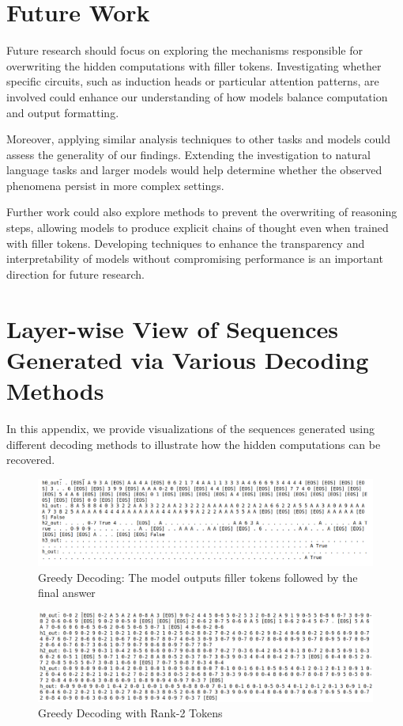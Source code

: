 \documentclass{article}
\begin{document}
\section{Future Work}

Future research should focus on exploring the mechanisms responsible for overwriting the hidden computations with filler tokens. Investigating whether specific circuits, such as induction heads or particular attention patterns, are involved could enhance our understanding of how models balance computation and output formatting.

Moreover, applying similar analysis techniques to other tasks and models could assess the generality of our findings. Extending the investigation to natural language tasks and larger models would help determine whether the observed phenomena persist in more complex settings.

Further work could also explore methods to prevent the overwriting of reasoning steps, allowing models to produce explicit chains of thought even when trained with filler tokens. Developing techniques to enhance the transparency and interpretability of models without compromising performance is an important direction for future research.

\newpage
\appendix

\section{Layer-wise View of Sequences Generated via Various Decoding Methods}

In this appendix, we provide visualizations of the sequences generated using different decoding methods to illustrate how the hidden computations can be recovered.

\begin{figure}[H]
    \centering
    \includegraphics[width=\textwidth]{greedy_decoding.png}
    \caption{Greedy Decoding: The model outputs filler tokens followed by the final answer}
    \label{fig:greedy}
\end{figure}

\begin{figure}[H]
    \centering
    \includegraphics[width=\textwidth]{rank2_decoding.png}
    \caption{Greedy Decoding with Rank-2 Tokens}
    \label{fig:rank2}
\end{figure}
\end{document}
